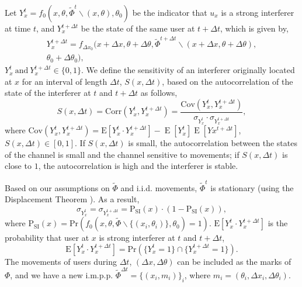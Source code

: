 \documentclass[10pt, conference, letterpaper]{IEEEtran}
\DeclareMathOperator*{\E}{\mathrm{E}}
\begin{document}
Let $Y_x^t=f_0(x, \theta, \tilde{\Phi}^t\backslash (x, \theta), \theta_0)$ be the indicator that $u_x$ is a strong interferer at time $t$, and $Y_x^{t+\Delta t}$ be the state of the same user at $t+\Delta t$, which is given by,
\begin{multline*}
Y_{x}^{t+\Delta t} = f_{\Delta x_0}(x+\Delta x, \theta + \Delta\theta, \tilde{\Phi}^{t+\Delta t}\backslash (x+\Delta x, \theta + \Delta\theta), \\
\theta_0 + \Delta\theta_0),
\end{multline*}
$Y_x^t \mathrm{~and~} Y_{x}^{t+\Delta t} \in \{0,1\}$. 
We define the sensitivity of an interferer originally located at $x$ for an interval of length $\Delta t$, $S(x, \Delta t)$, based on the autocorrelation of the state of the interferer at $t$ and $t+\Delta t$ as follows, 
\begin{equation}
S(x, \Delta t)
=\mathrm{Corr}(Y_x^t, Y_x^{t+\Delta t})
=\frac{\mathrm{Cov}(Y_x^t, Y_x^{t+\Delta t})}{\sigma_{Y_x^t}\cdot \sigma_{Y_x^{t+\Delta t}}},
\end{equation}
where $\mathrm{Cov}(Y_x^t, Y_x^{t+\Delta t}) = \mathrm{E}[Y_x^t\cdot Y_x^{t + \Delta t}] - \E[Y_x^t]\E[Yx^{t+\Delta t}]$, $S(x, \Delta t)\in [0,1]$. If $S(x, \Delta t)$ is small, the autocorrelation between the states of the channel is small and the channel sensitive to movements; if $S(x, \Delta t)$ is close to $1$, the autocorrelation is high and the interferer is stable.

Based on our assumptions on $\tilde{\Phi}$ and i.i.d. movements, $\tilde{\Phi}^t$ is stationary (using the Displacement Theorem \cite{poisson}).
As a result, 
\begin{equation*}
\sigma_{Y_x^t} = \sigma_{Y_x^{t+\Delta t}}=\mathrm{P}_{\mathrm{SI}}(x)\cdot (1-\mathrm{P}_{\mathrm{SI}}(x)),
\end{equation*}
where $\mathrm{P}_{\mathrm{SI}}(x)=\mathrm{Pr}(f_0(x,\theta,\tilde{\Phi}\backslash\{(x_i,\theta_i)\}, \theta_0)=1)$. 
$\mathrm{E}[Y_x^t\cdot Y_x^{t + \Delta t}]$ is the probability that user at $x$ is strong interferer at $t$ and $t + \Delta t$,
\begin{equation*}
\mathrm{E}[Y_x^t\cdot Y_x^{t + \Delta t}] = \mathrm{Pr}(\{Y_x^t=1\}\cap \{Y_x^{t+\Delta t}=1\}).
\end{equation*}
The movements of users during $\Delta t$, $(\Delta x, \Delta \theta)$ can be included as the marks of $\Phi$, and we have a new i.m.p.p. $\tilde{\Phi}^{\Delta t} = \{(x_i, m_i)\}_i$, where $m_i = (\theta_i, \Delta x_i, \Delta \theta_i)$.
\end{document}
